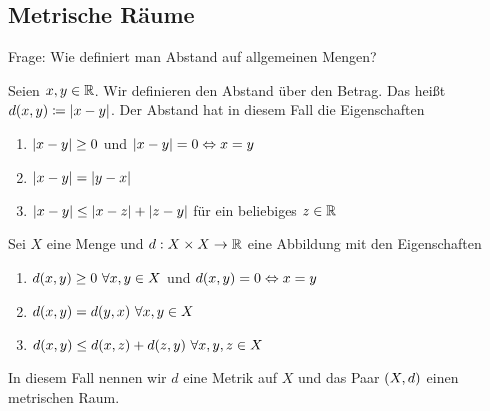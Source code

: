 \subsection{Metrische Räume}
\thispagestyle{pagenumberonly}

\marginnote{[07. Jun]}
Frage: Wie definiert man Abstand auf allgemeinen Mengen?

\begin{beispiel}
    Seien $x,y\in\mathbb{R}$. Wir definieren den Abstand über den Betrag. Das heißt $d\of{x,y}\coloneqq \abs{x-y}$.
    Der Abstand hat in diesem Fall die Eigenschaften
    \begin{enumerate}[label=(\roman*)]
        \item $\left\lvert x-y\right\rvert \geq 0$ und $\left\lvert x-y\right\rvert = 0 \Leftrightarrow{} x=y$
        \item $\left\lvert x-y\right\rvert = \left\lvert y-x\right\rvert$
        \item $\left\lvert x-y\right\rvert \leq \left\lvert x-z\right\rvert + \left\lvert z-y\right\rvert$ für ein beliebiges $z\in\mathbb{R}$
    \end{enumerate}
\end{beispiel}

\begin{definition}[Metrik]
    Sei $X$ eine Menge und $d: X \times X\rightarrow{} \mathbb{R}$ eine Abbildung mit den Eigenschaften
    \begin{enumerate}[label=(\roman*)]
        \item $d\of{x,y} \geq 0~\forall x,y\in X$ und $d\of{x,y} = 0\equivalent x = y$
        \item $d\of{x,y} = d\of{y,x}~\forall x,y\in X$
        \item $d\of{x,y} \leq d\of{x,z} + d\of{z,y}~\forall x,y,z\in X$
    \end{enumerate}
    In diesem Fall nennen wir $d$ eine Metrik auf $X$ und das Paar $\left(X, d\right)$ einen metrischen Raum.
\end{definition}

